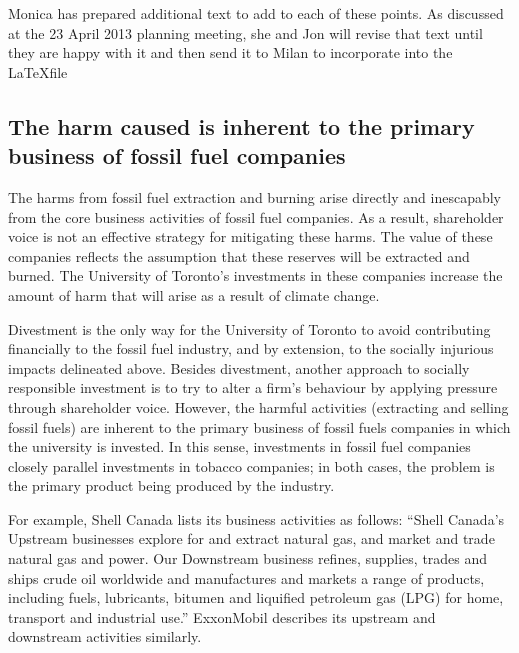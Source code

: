 \begin{vcom}
	Monica has prepared additional text to add to each of these points. As discussed at the 23 April 2013 planning meeting, she and Jon will revise that text until they are happy with it and then send it to Milan to incorporate into the \LaTeX file
\end{vcom}

	\subsection{The harm caused is inherent to the primary business of fossil fuel companies}
	
The harms from fossil fuel extraction and burning arise directly and inescapably from the core business activities of fossil fuel companies.
As a result, shareholder voice is not an effective strategy for mitigating these harms. 
The value of these companies reflects the assumption that these reserves will be extracted and burned.
The University of Toronto's investments in these companies increase the amount of harm that will arise as a result of climate change.



Divestment is the only way for the University of Toronto to avoid contributing financially to the fossil fuel industry, and by extension, to the socially injurious impacts delineated above.
Besides divestment, another approach to socially responsible investment is to try to alter a firm’s behaviour by applying pressure through shareholder voice. 
However, the harmful activities (extracting and selling fossil fuels) are inherent to the primary business of fossil fuels companies in which the university is invested.  
In this sense, investments in fossil fuel companies closely parallel investments in tobacco companies; in both cases, the problem is the primary product being produced by the industry.



For example, Shell Canada lists its business activities as follows: ``Shell Canada's Upstream businesses explore for and extract natural gas, and market and trade natural gas and power. Our Downstream business refines, supplies, trades and ships crude oil worldwide and manufactures and markets a range of products, including fuels, lubricants, bitumen and liquified petroleum gas (LPG) for home, transport and industrial use.'' ExxonMobil describes its upstream and downstream activities similarly.   



